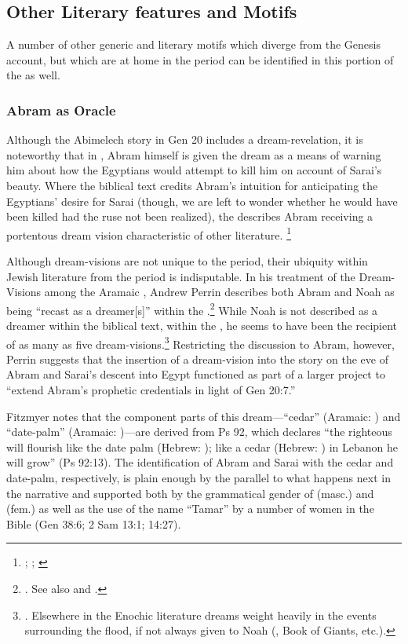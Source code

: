 \subsection{Other Literary features and Motifs}
A number of other generic and literary motifs which diverge from the Genesis account, but which are at home in the \secondtemple period can be identified in this portion of the \ga as well.

\subsubsection{Abram as Oracle}
Although the Abimelech story in Gen 20 includes a dream-revelation, it is noteworthy that in \ga, Abram himself is given the dream as a means of warning him about how the Egyptians would attempt to kill him on account of Sarai's beauty. Where the biblical text credits Abram's intuition for anticipating the Egyptians' desire for Sarai (though, we are left to wonder whether he would have been killed had the ruse not been realized), the \ga describes Abram receiving a portentous dream vision characteristic of other \secondtemple literature.%
%
\footnote{\cite{gevirtz_maarav1992}; \cite[184]{fitzmyer2004}; \cite{dacy_tzoref2013}}
%

Although dream-visions are not unique to the \secondtemple period, their ubiquity within Jewish literature from the \secondtemple period is indisputable. In his treatment of the Dream-Visions among the Aramaic \dss, Andrew Perrin describes both Abram and Noah as being ``recast as a dreamer[s]'' within the \ga.\footnote{\cite[52--57]{perrin2015}. See also \cite{eshel_klostergaard-etal2009} and \cite{machiela_falk-etal2010}.} While Noah is not described as a dreamer within the biblical text, within the \ga, he seems to have been the recipient of as many as five dream-visions.\footnote{\cite[53]{perrin2015}. Elsewhere in the Enochic literature dreams weight heavily in the events surrounding the flood, if not always given to Noah (\firstenoch, Book of Giants, etc.).} Restricting the discussion to Abram, however, Perrin suggests that the insertion of a dream-vision into the story on the eve of Abram and Sarai's descent into Egypt functioned as part of a larger project to ``extend Abram's prophetic credentials in light of Gen 20:7.''\autocite[55]{perrin2015} 

Fitzmyer notes that the component parts of this dream---``cedar'' (Aramaic: ) and ``date-palm'' (Aramaic: )---are derived from Ps 92, which declares ``the righteous will flourish like the date palm (Hebrew: ); like a cedar (Hebrew: ) in Lebanon he will grow'' (Ps 92:13). The identification of Abram and Sarai with the cedar and date-palm, respectively, is plain enough by the parallel to what happens next in the narrative and supported both by the grammatical gender of  (masc.) and  (fem.) as well as the use of the name ``Tamar'' by a number of women in the Bible (Gen 38:6; 2 Sam 13:1; 14:27). %

